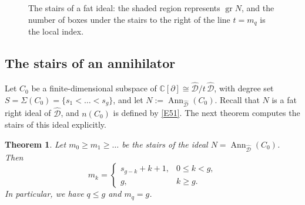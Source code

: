 \documentclass[11pt,reqno]{amsart}
\theoremstyle{plain}
\newtheorem{theorem}{Theorem}[section]
\theoremstyle{definition}
\theoremstyle{remark}
\numberwithin{equation}{section}
\newcommand{\cD}{\mathcal{D}}
\newcommand{\C}{\mathbb{C}}
\newcommand{\del}{\partial}
\newcommand{\hD}{\widehat{\cD}}
\DeclareMathOperator{\Ann}{Ann}
\DeclareMathOperator{\gr}{gr}
\begin{document}
\begin{figure}[h]
\begin{center}
\end{center}
\caption{The stairs of a fat ideal: the shaded region represents $\gr N$, and the number of boxes
under the stairs to the right of the line $t = m_q$ is the local index.}
\label{Fig}
\end{figure}

\subsection{The stairs of an annihilator}
\label{SA.2}
Let $C_0$ be a finite-dimensional subspace of $\C[\del] \cong \hD/t\,\hD$, with degree set
$S = \Sigma(C_0) = \{s_1 < \ldots < s_g\}$, and let $N := \Ann_{\hD}(C_0)$. Recall that $N$ is a
fat right ideal of $\hD$, and $n(C_0)$ is defined by \eqref{E51}. The next theorem computes the
stairs of this ideal explicitly.
%
\begin{theorem}
\label{TA.1}
Let $m_0 \ge m_1 \ge \ldots$ be the stairs of the ideal $N = \Ann_{\hD}(C_0)$. Then
\begin{equation}
\label{EAstairs}
  m_k = \begin{cases}
    s_{g-k} + k + 1 , & 0 \le k < g , \\
    g , & k \ge g .
  \end{cases}
\end{equation}
In particular, we have $q \le g$ and $m_q = g$.
\end{theorem}
\end{document}
